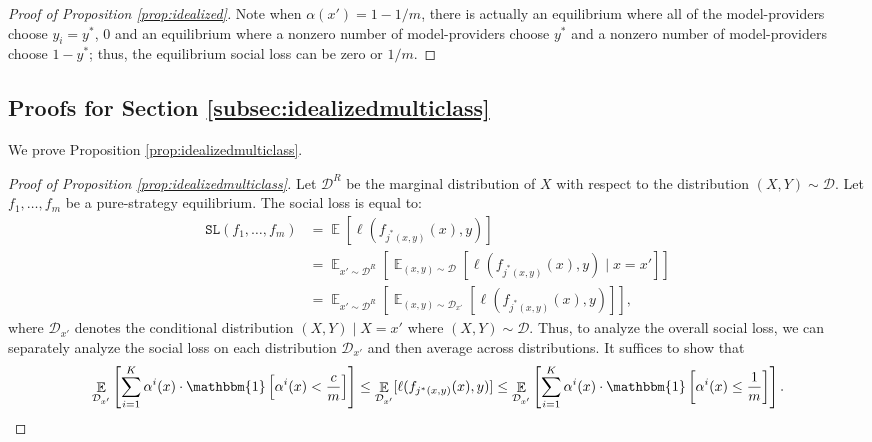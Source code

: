 \documentclass[letterpaper,11pt]{article}
\theoremstyle{plain}
\DeclareMathOperator*{\E}{\mathbb{E}}
\begin{document}
\begin{proof}[Proof of Proposition \ref{prop:idealized}]
Note when $\alpha(x') = 1 - 1/m$, there is actually an equilibrium where all of the model-providers choose $y_i = y^*$, $0$ and an equilibrium where a nonzero number of model-providers choose $y^*$ and a nonzero number of model-providers choose $1-y^*$; thus, the equilibrium social loss can be zero or $1/m$. 


\end{proof}

\subsection{Proofs for Section \ref{subsec:idealizedmulticlass}}\label{appendix:multiclass}

We prove Proposition \ref{prop:idealizedmulticlass}.
\begin{proof}[Proof of Proposition \ref{prop:idealizedmulticlass}]

Let $\mathcal{D}^R$ be the marginal distribution of $X$ with respect to the distribution $(X,Y) \sim \mathcal{D}$. Let $f_1, \ldots, f_m$ be a pure-strategy equilibrium. The social loss is equal to:
\begin{align*}
 \texttt{SL}(f_1, \ldots, f_m) &= \E[\ell(f_{j^*(x,y)}(x), y)] \\
 &= \E_{x' \sim \mathcal{D}^R} \left[\E_{(x,y) \sim \mathcal{D}}[\ell(f_{j^*(x,y)}(x), y) \mid x = x']\right] \\
 &= \E_{x' \sim \mathcal{D}^R} \left[ \E_{(x,y) \sim \mathcal{D}_{x'}}[\ell(f_{j^*(x,y)}(x), y)]\right], 
\end{align*}
where $\mathcal{D}_{x'}$ denotes the conditional distribution $(X,Y) \mid X = x'$ where $(X,Y) \sim \mathcal{D}$. Thus, to analyze the overall social loss, we can separately analyze the social loss on each distribution $\mathcal{D}_{x'}$ and then average across distributions. It suffices to show that 
\[\E_{\mathcal{D}_{x'}} \left[\sum_{i=1}^K \alpha^i(x) \cdot \mathbbm{1}\left[\alpha^i(x) < \frac{c}{m}\right] \right] \le \E_{\mathcal{D}_{x'}}[\ell(f_{j^*(x,y)}(x), y)] \le  \E_{\mathcal{D}_{x'}} \left[\sum_{i=1}^K \alpha^i(x) \cdot \mathbbm{1}\left[\alpha^i(x) \le \frac{1}{m} \right] \right]. \]


\end{proof}
\end{document}
